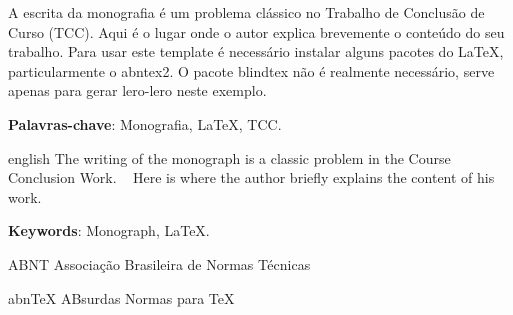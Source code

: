 \documentclass[
	12pt,			%
	openany,		%
	oneside,		%
	a4paper,		%
	english,		%
	brazil			%
	]{abntex2}
\begin{document}
\setlength{\absparsep}{18pt} %

\begin{resumo}
 A escrita da monografia é um problema clássico no Trabalho de Conclusão de Curso (TCC).
 Aqui é o lugar onde o autor explica brevemente o conteúdo do seu trabalho. Para usar este
 template é necessário instalar alguns pacotes do LaTeX, particularmente o abntex2. O pacote
 blindtex não é realmente necessário, serve apenas para gerar lero-lero neste exemplo.
 
 \textbf{Palavras-chave}: Monografia, LaTeX, TCC.
\end{resumo}

\begin{resumo}[Abstract]
 \begin{otherlanguage*}{english}
  The writing of the monograph is a classic problem in the Course Conclusion Work.
  Here is where the author briefly explains the content of his work.
 
 \textbf{Keywords}: Monograph, LaTeX.
 \end{otherlanguage*}
\end{resumo}


\listoffigures*
\cleardoublepage



\begin{siglas}
	\item[ABNT] Associação Brasileira de Normas Técnicas
	\item[abnTeX] ABsurdas Normas para TeX
  \end{siglas}
  


\tableofcontents*
\cleardoublepage

\textual







\postextual







\printindex
\end{document}
